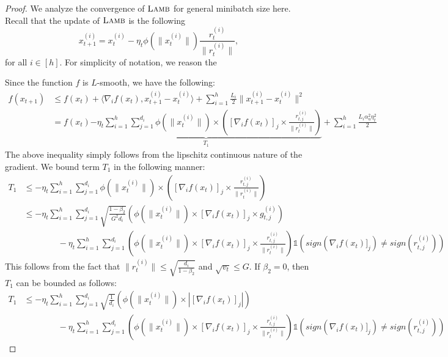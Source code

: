 \documentclass{article} \usepackage{iclr2020_conference,times}
\newcommand{\lamb}{\textsc{Lamb}}
\begin{document}
\begin{proof}
We analyze the convergence of $\lamb$ for general minibatch size here. Recall that the update of $\lamb$  is the following
$$
x_{t+1}^{(i)}  = x_{t}^{(i)} - \eta_t \phi(\|x_t^{(i)}\|) \frac{r_{t}^{(i)}}{\|r_t^{(i)}\|},
$$
for all $i \in [h]$. For simplicity of notation, we reason the 

Since the function $f$ is $L$-smooth, we have the following:
\begin{align}
f(x_{t+1}) &\leq f(x_t) + \langle \nabla_i f(x_t), x_{t+1}^{(i)} - x_{t}^{(i)} \rangle + \sum_{i=1}^h \frac{L_i}{2} \|x_{t+1}^{(i)} - x_t^{(i)}\|^2 \nonumber \\
&= f(x_t) \underbrace{- \eta_t  \sum_{i=1}^h \sum_{j=1}^{d_i} \phi(\|x_t^{(i)}\|)  \times \left( [\nabla_i f(x_t)]_j \times \frac{r_{t,j}^{(i)}}{\|r_{t}^{(i)}\|}  \right)}_{T_1} + \sum_{i=1}^h \frac{L_i \alpha_u^2 \eta_t^2}{2}
\label{eq:lamb-conv-eq1}
\end{align}
The above inequality simply follows from the lipschitz continuous nature of the gradient. We bound term $T_1$ in the following manner:
\begin{align}
T_1  &\leq - \eta_t  \sum_{i=1}^h \sum_{j=1}^{d_i} \phi(\|x_t^{(i)}\|) \times \left( [\nabla_i f(x_t)]_j \times \frac{r_{t,j}^{(i)}}{\|r_{t}^{(i)}\|}  \right) \nonumber \\
&\leq - \eta_t \sum_{i=1}^h \sum_{j=1}^{d_i} \sqrt{\frac{1 - \beta_2}{G^2d_i}} \left( \phi(\|x_t^{(i)}\|)  \times [\nabla_i f(x_t)]_j \times g_{t,j}^{(i)}  \right) \nonumber \\
&\qquad \qquad - \eta_t \sum_{i=1}^h \sum_{j=1}^{d_i} \left(\phi(\|x_t^{(i)}\|)  \times [\nabla_i f(x_t)]_j \times \frac{r_{t,j}^{(i)}}{\|r_{t}^{(i)}\|}  \right)\mathds{1}(sign(\nabla_i f(x_t)]_j) \neq sign(r_{t,j}^{(i)})) 
\label{eq:lamb-conv-eq2}
\end{align}
This follows from the fact that $\|r_{t}^{(i)}\| \leq \sqrt{\frac{d_i}{1 - \beta_2}}$ and $\sqrt{v_t} \leq G$. If $\beta_2 = 0$, then $T_1$ can be bounded as follows:
\begin{align*}
T_1 &\leq - \eta_t \sum_{i=1}^h \sum_{j=1}^{d_i} \sqrt{\frac{1}{d_i}} \left( \phi(\|x_t^{(i)}\|)  \times |[\nabla_i f(x_t)]_j| \right) \nonumber \\
&\qquad \qquad - \eta_t \sum_{i=1}^h \sum_{j=1}^{d_i} \left(\phi(\|x_t^{(i)}\|)  \times [\nabla_i f(x_t)]_j \times \frac{r_{t,j}^{(i)}}{\|r_{t}^{(i)}\|}  \right)\mathds{1}(sign(\nabla_i f(x_t)]_j) \neq sign(r_{t,j}^{(i)})) 
\end{align*}

\end{proof}
\end{document}
